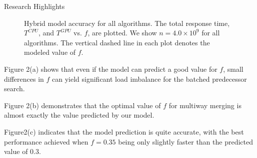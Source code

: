 \documentclass[final]{beamer}
\newlength{\colwidth}
\begin{document}
\begin{frame}[t]
\begin{columns}[t]
\begin{column}{\colwidth}
\begin{block}{Research Highlights}
\begin{figure}[htp]
\centering
{}
 \caption{Hybrid model accuracy for all algorithms. The total response time, $T^{CPU}$, and $T^{GPU}$ vs. $f$, are plotted. We show $n=4.0\times10^9$ for all algorithms. The vertical dashed line in each plot denotes the modeled value of $f$.}

 \label{fig:time_vs_f}
\end{figure}


\begin{description}[font=$\bullet$~\normalfont\scshape\color{red!50!black}]
\item  Figure 2(a) shows that even if the model can predict a good value for $f$, small differences in $f$ can yield significant load imbalance for the batched predecessor search. 
\item Figure 2(b) demonstrates that the optimal value of $f$ for multiway merging is almost exactly the value predicted by our model.
\item  Figure2(c) indicates that the model prediction is quite accurate, with the best performance achieved when $f=0.35$ being only slightly faster than the predicted value of 0.3.
\end{description}



\end{block}
\end{column}
\end{columns}
\end{frame}
\end{document}
